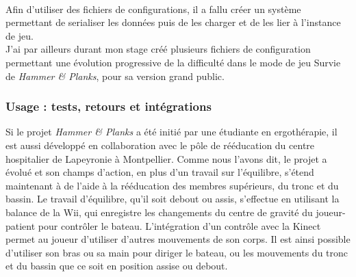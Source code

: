 \paragraph{}Afin d'utiliser des fichiers de configurations, il a fallu créer un système permettant de serialiser les données puis de les charger et de les lier à l'instance de jeu.\\
J'ai par ailleurs durant mon stage créé plusieurs fichiers de configuration permettant une évolution progressive de la difficulté dans le mode de jeu Survie de \emph{Hammer \& Planks}, pour sa version grand public.

	\subsubsection*{Usage : tests, retours et intégrations}
Si le projet \emph{Hammer \& Planks} a été initié par une étudiante en ergothérapie, il est aussi développé en collaboration avec le pôle de rééducation du centre hospitalier de Lapeyronie à Montpellier. Comme nous l'avons dit, le projet a évolué et son champs d'action, en plus d'un travail sur l'équilibre, s'étend maintenant à de l'aide à la rééducation des membres supérieurs, du tronc et du bassin. Le travail d'équilibre, qu'il soit debout ou assis, s'effectue en utilisant la balance de la Wii, qui enregistre les changements du centre de gravité du joueur-patient pour contrôler le bateau. L'intégration d'un contrôle avec la Kinect permet au joueur d'utiliser d'autres mouvements de son corps. Il est ainsi possible d'utiliser son bras ou sa main pour diriger le bateau, ou les mouvements du tronc et du bassin que ce soit en position assise ou debout.

